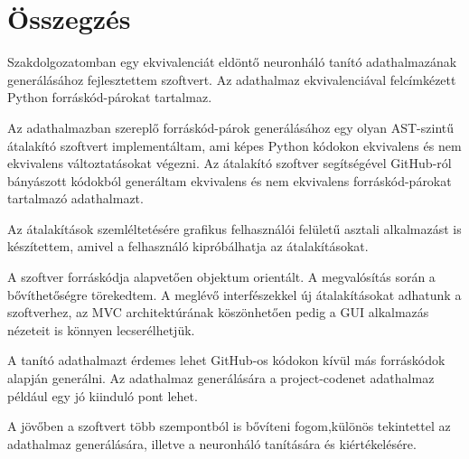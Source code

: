 \chapter{Összegzés}
\label{ch:sum}

Szakdolgozatomban egy ekvivalenciát eldöntő neuronháló tanító adathalmazának generálásához fejlesztettem szoftvert.
Az adathalmaz ekvivalenciával felcímkézett Python forráskód-párokat tartalmaz.

Az adathalmazban szereplő forráskód-párok generálásához egy olyan AST-szintű
átalakító szoftvert implementáltam,
ami képes Python kódokon ekvivalens és nem ekvivalens változtatásokat végezni.
Az átalakító szoftver segítségével GitHub-ról bányászott kódokból generáltam
ekvivalens és nem ekvivalens forráskód-párokat tartalmazó adathalmazt.

Az átalakítások szemléltetésére grafikus felhasználói felületű asztali alkalmazást is készítettem,
amivel a felhasználó kipróbálhatja az átalakításokat.

A szoftver forráskódja alapvetően objektum orientált.
A megvalósítás során a bővíthetőségre törekedtem.
A meglévő interfészekkel új átalakításokat adhatunk a szoftverhez, az MVC architektúrának köszönhetően pedig a GUI alkalmazás nézeteit is könnyen lecserélhetjük.

A tanító adathalmazt érdemes lehet GitHub-os kódokon kívül más forráskódok alapján generálni.
Az adathalmaz generálására a project-codenet \cite{puri2021codenet} adathalmaz például egy jó kiinduló pont lehet.

A jövőben a szoftvert több szempontból is bővíteni fogom,különös tekintettel
az adathalmaz generálására, illetve a neuronháló tanítására és kiértékelésére.
